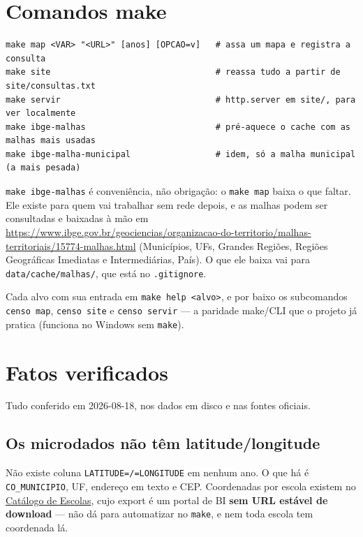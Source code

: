 \documentclass[11pt]{article}
\begin{document}
\section{Comandos make}
\label{sec:orgc0e74e1}

\begin{verbatim}
make map <VAR> "<URL>" [anos] [OPCAO=v]   # assa um mapa e registra a consulta
make site                                 # reassa tudo a partir de site/consultas.txt
make servir                               # http.server em site/, para ver localmente
make ibge-malhas                          # pré-aquece o cache com as malhas mais usadas
make ibge-malha-municipal                 # idem, só a malha municipal (a mais pesada)
\end{verbatim}

\texttt{make ibge-malhas} é conveniência, não obrigação: o \texttt{make map} baixa o que
faltar. Ele existe para quem vai trabalhar sem rede depois, e as malhas
podem ser consultadas e baixadas à mão em
\url{https://www.ibge.gov.br/geociencias/organizacao-do-territorio/malhas-territoriais/15774-malhas.html}
(Municípios, UFs, Grandes Regiões, Regiões Geográficas Imediatas e
Intermediárias, País). O que ele baixa vai para \texttt{data/cache/malhas/}, que
está no \texttt{.gitignore}.

Cada alvo com sua entrada em \texttt{make help <alvo>}, e por baixo os subcomandos
\texttt{censo map}, \texttt{censo site} e \texttt{censo servir} — a paridade make/CLI que o
projeto já pratica (funciona no Windows sem \texttt{make}).
\section{Fatos verificados}
\label{sec:org609f35e}

Tudo conferido em 2026-08-18, nos dados em disco e nas fontes oficiais.
\subsection{Os microdados não têm latitude/longitude}
\label{sec:org7c2209f}

Não existe coluna \texttt{LATITUDE=/=LONGITUDE} em nenhum ano. O que há é
\texttt{CO\_MUNICIPIO}, UF, endereço em texto e CEP. Coordenadas por escola existem
no \href{https://www.gov.br/inep/pt-br/acesso-a-informacao/dados-abertos/inep-data/catalogo-de-escolas}{Catálogo de Escolas}, cujo export é um portal de BI \textbf{sem URL estável de
download} — não dá para automatizar no \texttt{make}, e nem toda escola tem
coordenada lá.
\end{document}
